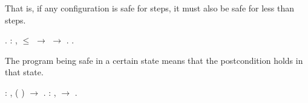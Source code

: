 \documentclass[12pt]{report}
\begin{document}
 That is, if any configuration is safe for  steps, it
    must also be safe for less than  steps. \begin{coqdoccode}
\coqdocemptyline
\coqdocnoindent
{}  .\coqdoceol
\coqdocemptyline
\coqdocnoindent
{}  :\coqdoceol
\coqdocindent{1.00em}
\coqdockw{\ensuremath{\forall}}          ,\coqdoceol
\coqdocindent{1.00em}
 \ensuremath{\le}  \ensuremath{\rightarrow}\coqdoceol
\coqdocindent{1.00em}
          \ensuremath{\rightarrow}\coqdoceol
\coqdocindent{1.00em}
         .\coqdoceol
\coqdocemptyline
\coqdocnoindent
{}  .\coqdoceol
\coqdocemptyline
\end{coqdoccode}
The  program being safe in a certain state
    means that the postcondition holds in that state. \begin{coqdoccode}
\coqdocemptyline
\coqdocnoindent
{}  :\coqdoceol
\coqdocindent{1.00em}
\coqdockw{\ensuremath{\forall}}        ,\coqdoceol
\coqdocindent{1.00em}
 ( )         \ensuremath{\rightarrow}\coqdoceol
\coqdocindent{1.00em}
     .\coqdoceol
\coqdocemptyline
\coqdocnoindent
{}  :\coqdoceol
\coqdocindent{1.00em}
\coqdockw{\ensuremath{\forall}}        ,\coqdoceol
\coqdocindent{1.00em}
      \ensuremath{\rightarrow}\coqdoceol
\coqdocindent{1.00em}
         .\coqdoceol
\coqdocemptyline
\end{coqdoccode}
\end{document}
